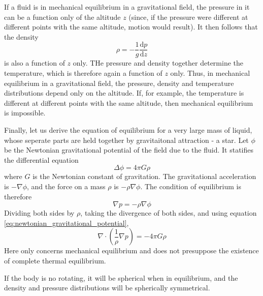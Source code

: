 \documentclass[conference]{IEEEtran}
\theoremstyle{definition}
\theoremstyle{remark}
\begin{document}
    If a fluid is in mechanical equilibrium in a gravitational field, the pressure in it can be a function only of the altitude $z$ (since, if the pressure were different at different points with the same altitude, motion would result). It then follows that the density
    \begin{equation}
        \rho = -\dfrac1{g} \dfrac{\mathrm{d} p}{\mathrm{d} z}
    \end{equation}
    is also a function of $z$ only. THe pressure and density together determine the temperature, which is therefore again a function of $z$ only. Thus, in mechanical equilibrium in a gravitational field, the pressure, density and temperature distributions depend only on the altitude. If, for example, the temperature is different at different points with the same altitude, then mechanical equilibrium is impossible.

    Finally, let us derive the equation of equilibrium for a very large mass of liquid, whose seperate parts are held together by gravitaitonal attraction - a star. Let $\phi$ be the Newtonian gravitational potential of the field due to the fluid. It statifies the differential equation
    \begin{equation}
        \Delta \phi = 4 \pi G \rho
        \label{eq:newtonian_gravitational_potential}
    \end{equation}
    where $G$ is the Newtonian constant of gravitation. The gravitational acceleration is $-\nabla \phi$, and the force on a mass $\rho$ is $-\rho \nabla \phi$. The condition of equilibrium is therefore
    \[
        \nabla p = - \rho \nabla \phi
    \]
    Dividing both sides by $\rho$, taking the divergence of both sides, and using equation \ref{eq:newtonian_gravitational_potential},
    \begin{equation}
        \nabla \cdot \left( \dfrac1\rho \nabla p \right) = -4\pi G\rho
    \end{equation}
    Here only concerns mechanical equilibrium and does not presuppose the existence of complete thermal equilibrium.

    If the body is no rotating, it will be spherical when in equilibrium, and the density and pressure distributions will be spherically symmetrical. 
\end{document}

